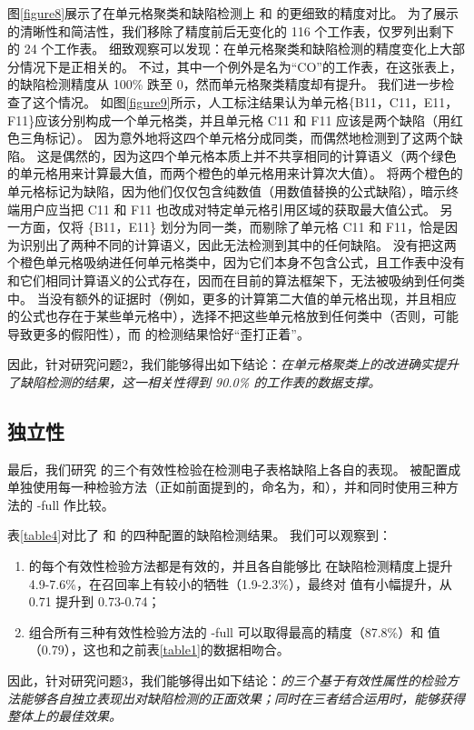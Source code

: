 图\ref{figure8}展示了在单元格聚类和缺陷检测上 \wa 和 \cu 的更细致的精度对比。
为了展示的清晰性和简洁性，我们移除了精度前后无变化的 116 个工作表，仅罗列出剩下的 24 个工作表。
细致观察可以发现：在单元格聚类和缺陷检测的精度变化上大部分情况下是正相关的。
不过，其中一个例外是名为“CO”的工作表，在这张表上，\wa 的缺陷检测精度从 100\% 跌至 0，然而单元格聚类精度却有提升。
我们进一步检查了这个情况。
如图\ref{figure9}所示，人工标注结果认为单元格\{B11，C11，E11，F11\}应该分别构成一个单元格类，并且单元格 C11 和 F11 应该是两个缺陷（用红色三角标记）。
\cu 因为意外地将这四个单元格分成同类，而偶然地检测到了这两个缺陷。
这是偶然的，因为这四个单元格本质上并不共享相同的计算语义（两个绿色的单元格用来计算最大值，而两个橙色的单元格用来计算次大值）。
\cu 将两个橙色的单元格标记为缺陷，因为他们仅仅包含纯数值（用数值替换的公式缺陷），暗示终端用户应当把 C11 和 F11 也改成对特定单元格引用区域的获取最大值公式。
另一方面，\wa 仅将 \{B11，E11\} 划分为同一类，而剔除了单元格 C11 和 F11，恰是因为识别出了两种不同的计算语义，因此无法检测到其中的任何缺陷。
\wa 没有把这两个橙色单元格吸纳进任何单元格类中，因为它们本身不包含公式，且工作表中没有和它们相同计算语义的公式存在，因而在目前的算法框架下，无法被吸纳到任何类中。
当没有额外的证据时（例如，更多的计算第二大值的单元格出现，并且相应的公式也存在于某些单元格中），\wa 选择不把这些单元格放到任何类中（否则，可能导致更多的假阳性），而 \cu 的检测结果恰好“歪打正着”。

因此，针对研究问题2，我们能够得出如下结论：\textit{\wa 在单元格聚类上的改进确实提升了缺陷检测的结果，这一相关性得到 90.0\% 的工作表的数据支撑。}

\subsection{独立性}

最后，我们研究 \wa 的三个有效性检验在检测电子表格缺陷上各自的表现。
\wa 被配置成单独使用每一种检验方法（正如前面提到的，命名为\wasc，\wamc 和\wawc ），并和同时使用三种方法的 \wa-full 作比较。

表\ref{table4}对比了 \cu 和 \wa 的四种配置的缺陷检测结果。
我们可以观察到：
\begin{enumerate}
    \item \wa 的每个有效性检验方法都是有效的，并且各自能够比 \cu 在缺陷检测精度上提升 4.9-7.6\%，在召回率上有较小的牺牲（1.9-2.3\%），最终对 \fmd 值有小幅提升，从 0.71 提升到 0.73-0.74；
    \item 组合所有三种有效性检验方法的 \wa-full 可以取得最高的精度（87.8\%）和 \fmd 值（0.79），这也和之前表\ref{table1}的数据相吻合。
\end{enumerate}

因此，针对研究问题3，我们能够得出如下结论：\textit{\wa 的三个基于有效性属性的检验方法能够各自独立表现出对缺陷检测的正面效果；同时在三者结合运用时，能够获得整体上的最佳效果。}